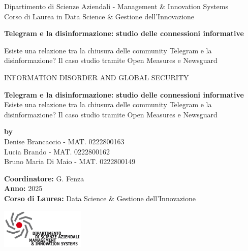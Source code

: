 \documentclass[12pt]{article}
\begin{document}
\begin{titlepage}
		{\large\color{white}Dipartimento di Scienze Aziendali - Management \& Innovation Systems\\
			Corso di Laurea in Data Science \& Gestione dell'Innovazione\par}
		\vspace{0.8cm}
		
		{\Huge\color{white}\textbf{Telegram e la disinformazione: studio delle connessioni informative}\par}
		\vspace{1cm}
		
		{\Large\color{white}Esiste una relazione tra la chiusura delle community Telegram e la disinformazione? Il caso studio tramite Open Measures e Newsguard \par}
		\vspace{1.5cm}
		
		{\large\color{white}INFORMATION DISORDER AND GLOBAL SECURITY\par}
		\vspace{0.5cm}
		
		\vfill
		
	\end{titlepage}
	\newpage
	\begin{titlepage}
		\centering
		\vspace*{1cm}
		
		{\Huge \textbf{Telegram e la disinformazione: studio delle connessioni informative}}\\
		\vspace{0.5cm}
		{\LARGE Esiste una relazione tra la chiusura delle community Telegram e la disinformazione? Il caso studio tramite Open Measures e Newsguard}\\
		\vspace{1.5cm}
		
		\textbf{by}\\
		\vspace{0.5cm}
		{\Large Denise Brancaccio - MAT. 0222800163}\\
		{\Large Lucia Brando - MAT. 0222800162}\\
		{\Large Bruno Maria Di Maio - MAT. 0222800149}
		\vspace{0.5cm}
		
		\vfill
		
		\textbf{Coordinatore:} G. Fenza \\
		\textbf{Anno:} 2025 \\
		\textbf{Corso di Laurea:} Data Science \& Gestione dell'Innovazione \\
		\vspace{1cm}
		
		\includegraphics[width=0.3\textwidth]{immagini/logodisamis}\\
		\vspace{0.5cm}
		\vspace*{1cm}
	\end{titlepage}
\end{document}
